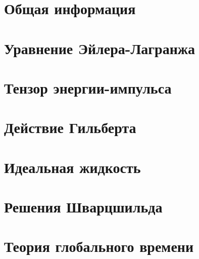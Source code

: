 \documentclass[12pt,a4paper]{article}
\providecommand{\docroot}{../..}
\begin{document}
    \begin{appendix}

        \section{Общая информация}
        

        \section{Уравнение Эйлера-Лагранжа}
        

        \section{Тензор энергии-импульса}
        

        \section{Действие Гильберта}
        

        \section{Идеальная жидкость}
        

        \section{Решения Шварцшильда}
        

        \section{Теория глобального времени}
        

    \end{appendix}

    \todototoc\listoftodos

    \clearpage

    
    
\end{document}
